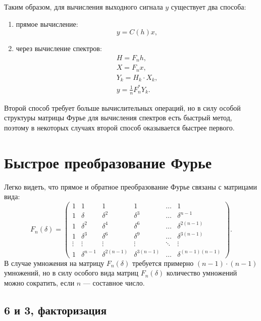 Таким образом, для вычисления выходного сигнала $y$ существует два способа:
\begin{enumerate}
    \item прямое вычисление:
    \[
        y = C(h) x,
    \]
    \item через вычисление спектров:
    \begin{gather*}
        H = F_n h, \\
        X = F_n x, \\
        Y_k = H_k \cdot X_k, \\
        y = \frac{1}{n} F_n^* Y_k .
    \end{gather*}
\end{enumerate}
Второй способ требует больше вычислительных операций, но в силу особой структуры матрицы Фурье для вычисления спектров есть быстрый метод, поэтому в некоторых случаях второй способ
оказывается быстрее первого.


\section{Быстрое преобразование Фурье}

Легко видеть, что прямое и обратное преобразование Фурье связаны с матрицами вида:
\[
    F_n(\delta)
    = \begin{pmatrix}
          1      & 1            & 1               & 1               & \dots  & 1                   \\
          1      & \delta       & \delta^2        & \delta^3        & \dots  & \delta^{n-1}        \\
          1      & \delta^2     & \delta^4        & \delta^6        & \dots  & \delta^{2(n-1)}     \\
          1      & \delta^3     & \delta^6        & \delta^9        & \dots  & \delta^{3(n-1)}     \\
          \vdots & \vdots       & \vdots          & \vdots          & \ddots & \vdots              \\
          1      & \delta^{n-1} & \delta^{2(n-1)} & \delta^{3(n-1)} & \dots  & \delta^{(n-1)(n-1)}
    \end{pmatrix}.
\]
В случае умножения на матрицу $F_n(\delta)$ требуется примерно $(n-1) \cdot (n-1)$ умножений, но в силу особого вида матриц $F_n(\delta)$ количество умножений можно сократить,
если $n$ --- составное число.

\subsection{6 и 3, факторизация}


